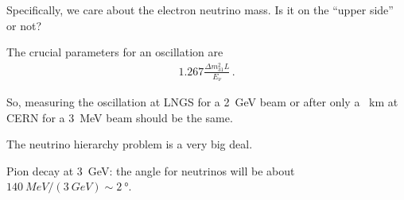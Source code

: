 \documentclass[main.tex]{subfiles}
\begin{document}
Specifically, we care about the electron neutrino mass. Is it on the ``upper side'' 
or not? 

The crucial parameters for an oscillation are 
%
\begin{align}
1.267 \frac{\Delta m_{31}^2 L}{E_\nu }
\,.
\end{align}

So, measuring the oscillation at LNGS for a \SI{2}{GeV} beam 
or after only a \SI{}{km} at CERN for a \SI{3}{MeV} beam should be the same. 

The neutrino hierarchy problem is a very big deal. 

Pion decay at \SI{3}{GeV}: the angle for neutrinos will be about \(\SI{140}{MeV} / (\SI{3}{GeV}) \sim \SI{2}{\degree}\).  
\end{document}

